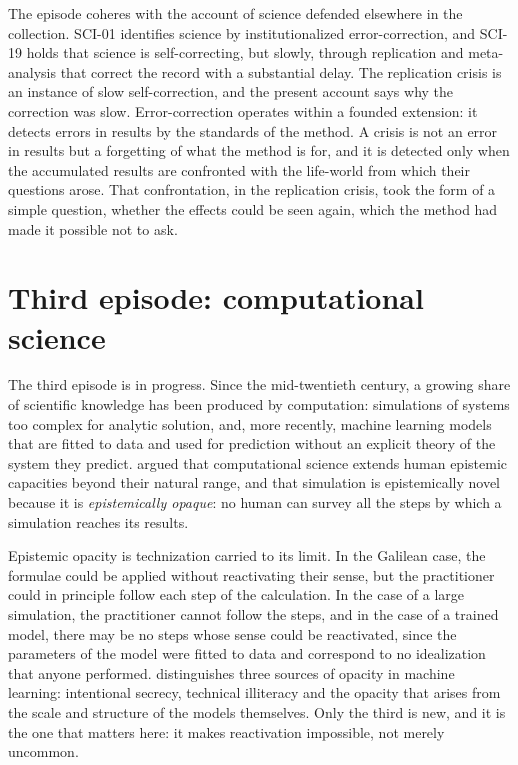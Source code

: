 \documentclass{situationist-preprint}
\begin{document}
The episode coheres with the account of science defended elsewhere in the collection. SCI-01 identifies science by institutionalized error-correction, and SCI-19 holds that science is self-correcting, but slowly, through replication and meta-analysis that correct the record with a substantial delay. The replication crisis is an instance of slow self-correction, and the present account says why the correction was slow. Error-correction operates within a founded extension: it detects errors in results by the standards of the method. A crisis is not an error in results but a forgetting of what the method is for, and it is detected only when the accumulated results are confronted with the life-world from which their questions arose. That confrontation, in the replication crisis, took the form of a simple question, whether the effects could be seen again, which the method had made it possible not to ask.

\section{Third episode: computational science}\label{s:computation}

The third episode is in progress. Since the mid-twentieth century, a growing share of scientific knowledge has been produced by computation: simulations of systems too complex for analytic solution, and, more recently, machine learning models that are fitted to data and used for prediction without an explicit theory of the system they predict. \citet{Humphreys2004} argued that computational science extends human epistemic capacities beyond their natural range, and \citet{Humphreys2009} that simulation is epistemically novel because it is \emph{epistemically opaque}: no human can survey all the steps by which a simulation reaches its results.

Epistemic opacity is technization carried to its limit. In the Galilean case, the formulae could be applied without reactivating their sense, but the practitioner could in principle follow each step of the calculation. In the case of a large simulation, the practitioner cannot follow the steps, and in the case of a trained model, there may be no steps whose sense could be reactivated, since the parameters of the model were fitted to data and correspond to no idealization that anyone performed. \citet{Burrell2016} distinguishes three sources of opacity in machine learning: intentional secrecy, technical illiteracy and the opacity that arises from the scale and structure of the models themselves. Only the third is new, and it is the one that matters here: it makes reactivation impossible, not merely uncommon.
\end{document}
